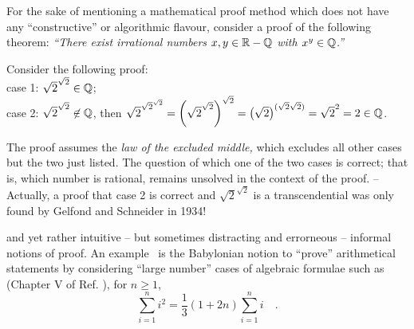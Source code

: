  For the sake of mentioning a mathematical proof method which
 does not have any ``constructive'' or algorithmic flavour, consider a proof of the
 following theorem: {\em ``There exist
 irrational numbers $x,y\in {\Bbb R} - {\Bbb Q}$ with $x^y\in {\Bbb Q}$.''}

{\color{OliveGreen}
\bproof
{Consider the following proof:}\\
case 1: $ \sqrt{2} ^{ \sqrt{2} } \in {\Bbb Q} $;
  \\
case 2: $ \sqrt{2} ^{ \sqrt{2} } \not\in {\Bbb Q}$, then
$ \sqrt{2} ^{{ \sqrt{2} } ^{ \sqrt{2} }}
={\left({\sqrt{2} }^{ \sqrt{2} } \right)}^{ \sqrt{2} }
=\left(\sqrt{2}\right) ^{(  \sqrt{2}   \sqrt{2}  )} =
\sqrt{2} ^2 =2\in {\Bbb Q}$.
\eproof
}

The proof assumes the {\em law of the excluded middle,}
which excludes all other cases but the two just listed.
The question of which one of the two cases is correct; that is,
which number is rational, remains unsolved in the context of the proof.
--
Actually, a proof that case 2 is correct and  $\sqrt{2} ^{
 \sqrt{2} }$ is a transcendential was only found by  Gelfond and Schneider
in 1934!



 and yet rather intuitive -- but sometimes distracting and errorneous -- informal notions of proof.
An example~\cite{baats1} is the Babylonian notion to ``prove'' arithmetical statements
by considering ``large number'' cases
of algebraic formulae such as  (Chapter V of Ref. \cite{neugeb}), for $n\ge 1$,
\begin{equation}
\sum_{i=1}^n i^2 = \frac{1}{3}\left(1+2n\right)\sum_{i=1}^n i \quad .
\label{2013-m-ch-intros-f1}
\end{equation}

